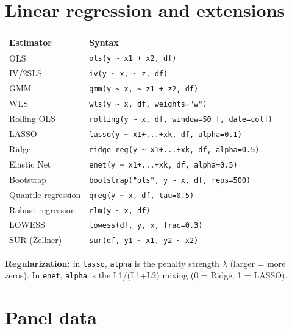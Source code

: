 \section{Linear regression and extensions}

\begin{center}
\begin{tabular}{ll}
\toprule
\textbf{Estimator} & \textbf{Syntax} \\
\midrule
OLS               & \texttt{ols(y \textasciitilde{} x1 + x2, df)} \\
IV/2SLS           & \texttt{iv(y \textasciitilde{} x, \textasciitilde{} z, df)} \\
GMM               & \texttt{gmm(y \textasciitilde{} x, \textasciitilde{} z1 + z2, df)} \\
WLS               & \texttt{wls(y \textasciitilde{} x, df, weights="w")} \\
Rolling OLS       & \texttt{rolling(y \textasciitilde{} x, df, window=50 [, date=col])} \\
\midrule
LASSO             & \texttt{lasso(y \textasciitilde{} x1+...+xk, df, alpha=0.1)} \\
Ridge             & \texttt{ridge\_reg(y \textasciitilde{} x1+...+xk, df, alpha=0.5)} \\
Elastic Net       & \texttt{enet(y \textasciitilde{} x1+...+xk, df, alpha=0.5)} \\
\midrule
Bootstrap         & \texttt{bootstrap("ols", y \textasciitilde{} x, df, reps=500)} \\
\midrule
Quantile regression  & \texttt{qreg(y \textasciitilde{} x, df, tau=0.5)} \\
Robust regression    & \texttt{rlm(y \textasciitilde{} x, df)} \\
LOWESS               & \texttt{lowess(df, y, x, frac=0.3)} \\
\midrule
SUR (Zellner)     & \texttt{sur(df, y1 \textasciitilde{} x1, y2 \textasciitilde{} x2)} \\
\bottomrule
\end{tabular}
\end{center}

{\footnotesize \textbf{Regularization:} in \texttt{lasso}, \texttt{alpha} is the penalty
strength $\lambda$ (larger = more zeros). In \texttt{enet}, \texttt{alpha}
is the L1/(L1+L2) mixing (0 = Ridge, 1 = LASSO).}

\section{Panel data}

